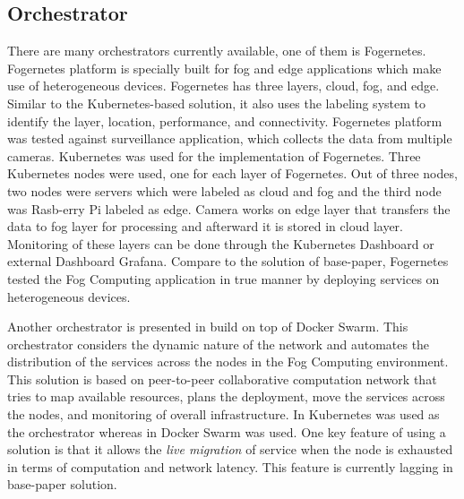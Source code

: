 \subsection{Orchestrator}
\label{sec:infra}
There are many orchestrators currently available, one of them is Fogernetes\cite{Wobker2018}. Fogernetes\cite{Wobker2018} platform is specially built for fog and edge applications which make use of heterogeneous devices. Fogernetes\cite{Wobker2018} has three layers, cloud, fog, and edge. Similar to the Kubernetes-based solution\cite{Santos2019}, it also uses the labeling system to identify the layer, location, performance, and connectivity\cite{Wobker2018}. Fogernetes\cite{Wobker2018} platform was tested against surveillance application, which collects the data from multiple cameras. Kubernetes was used for the implementation of Fogernetes\cite{Wobker2018}. Three Kubernetes nodes were used, one for each layer of Fogernetes\cite{Wobker2018}. Out of three nodes, two nodes were servers which were labeled as cloud and fog and the third node was Rasb-erry Pi labeled as edge\cite{Wobker2018}. Camera works on edge layer that transfers the data to fog layer for processing and afterward it is stored in cloud layer. Monitoring of these layers can be done through the  Kubernetes Dashboard or external Dashboard Grafana. Compare to the solution of base-paper\cite{Santos2019}, Fogernetes\cite{Wobker2018} tested the Fog Computing application in true manner by deploying services on heterogeneous devices.\par
Another orchestrator is presented in \cite{Reale} build on top of Docker Swarm. This orchestrator considers the dynamic nature of the network and automates the distribution of the services across the nodes in the Fog Computing environment\cite{Reale}. This solution is based on peer-to-peer collaborative computation network that tries to map available resources, plans the deployment, move the services across the nodes, and monitoring of overall infrastructure\cite{Reale}. In \cite{Santos2019} Kubernetes was used as the orchestrator whereas in \cite{Reale} Docker Swarm was used. One key feature of using a solution\cite{Reale} is that it allows the \emph{live migration} of service when the node is exhausted in terms of computation and network latency. This feature is currently lagging in base-paper solution\cite{Santos2019}.
